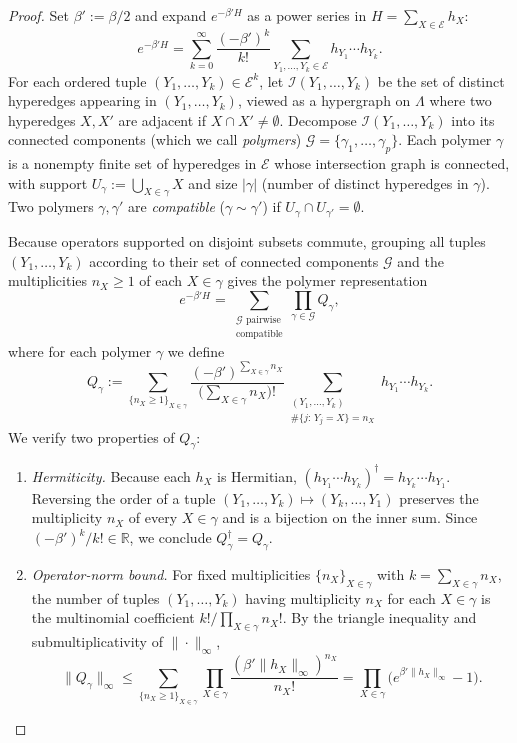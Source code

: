 \documentclass[11pt,a4paper]{article}
\numberwithin{equation}{section}
\theoremstyle{plain}
\theoremstyle{definition}
\begin{document}
\begin{proof}
Set $\beta' := \beta/2$ and expand $e^{-\beta' H}$ as a power series in $H = \sum_{X\in\mathcal{E}} h_X$:
\[
  e^{-\beta' H} = \sum_{k=0}^\infty \frac{(-\beta')^k}{k!}\sum_{Y_1,\dots,Y_k\in\mathcal{E}} h_{Y_1}\cdots h_{Y_k}.
\]
For each ordered tuple $(Y_1,\dots,Y_k)\in\mathcal{E}^k$, let $\mathcal{I}(Y_1,\dots,Y_k)$ be the set of distinct hyperedges appearing in $(Y_1,\dots,Y_k)$, viewed as a hypergraph on $\Lambda$ where two hyperedges $X,X'$ are adjacent if $X\cap X'\ne\emptyset$. Decompose $\mathcal{I}(Y_1,\dots,Y_k)$ into its connected components (which we call \emph{polymers}) $\mathcal{G} = \{\gamma_1,\dots,\gamma_p\}$. Each polymer $\gamma$ is a nonempty finite set of hyperedges in $\mathcal{E}$ whose intersection graph is connected, with support $U_\gamma := \bigcup_{X\in\gamma} X$ and size $|\gamma|$ (number of distinct hyperedges in $\gamma$). Two polymers $\gamma,\gamma'$ are \emph{compatible} ($\gamma\sim\gamma'$) if $U_\gamma\cap U_{\gamma'} = \emptyset$.

Because operators supported on disjoint subsets commute, grouping all tuples $(Y_1,\dots,Y_k)$ according to their set of connected components $\mathcal{G}$ and the multiplicities $n_X \ge 1$ of each $X\in\gamma$ gives the polymer representation
\begin{equation}\label{eq:poly-op}
  e^{-\beta' H} = \sum_{\substack{\mathcal{G}\text{ pairwise}\\\text{compatible}}} \prod_{\gamma\in\mathcal{G}} Q_\gamma,
\end{equation}
where for each polymer $\gamma$ we define
\[
  Q_\gamma := \sum_{\{n_X\ge 1\}_{X\in\gamma}} \frac{(-\beta')^{\sum_{X\in\gamma} n_X}}{\bigl(\sum_{X\in\gamma} n_X\bigr)!}
  \sum_{\substack{(Y_1,\dots,Y_k)\\ \#\{j:\,Y_j=X\}=n_X}} h_{Y_1}\cdots h_{Y_k}.
\]
We verify two properties of $Q_\gamma$:
\begin{enumerate}
  \setlength{\itemsep}{2pt}\setlength{\parskip}{0pt}
  \item[\emph{(i)}] \emph{Hermiticity.} Because each $h_X$ is Hermitian, $(h_{Y_1}\cdots h_{Y_k})^\dagger = h_{Y_k}\cdots h_{Y_1}$. Reversing the order of a tuple $(Y_1,\dots,Y_k)\mapsto(Y_k,\dots,Y_1)$ preserves the multiplicity $n_X$ of every $X\in\gamma$ and is a bijection on the inner sum. Since $(-\beta')^k/k!\in\mathbb{R}$, we conclude $Q_\gamma^\dagger = Q_\gamma$.
  \item[\emph{(ii)}] \emph{Operator-norm bound.} For fixed multiplicities $\{n_X\}_{X\in\gamma}$ with $k = \sum_{X\in\gamma} n_X$, the number of tuples $(Y_1,\dots,Y_k)$ having multiplicity $n_X$ for each $X\in\gamma$ is the multinomial coefficient $k!/\prod_{X\in\gamma} n_X!$. By the triangle inequality and submultiplicativity of $\|\cdot\|_\infty$,
  \[
    \|Q_\gamma\|_\infty \le \sum_{\{n_X\ge 1\}_{X\in\gamma}} \prod_{X\in\gamma}\frac{(\beta'\|h_X\|_\infty)^{n_X}}{n_X!}
    = \prod_{X\in\gamma}\bigl(e^{\beta'\|h_X\|_\infty} - 1\bigr).
  \]
\end{enumerate}


\end{proof}
\end{document}
